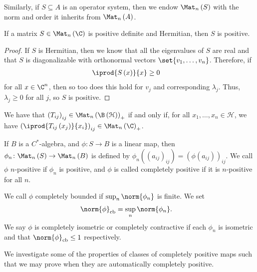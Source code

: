 \documentclass[10pt]{mypackage}
\DeclareMathOperator{\cb}{cb}
\begin{document}
Similarly, if $S\subseteq A$ is an operator system, then we endow $\Mat_n\left( S \right)$ with the norm and order it inherits from $\Mat_n\left( A \right)$.
\begin{definition}
  If a matrix $S\in \Mat_n\left( \C \right)$ is positive definite and Hermitian, then $S$ is positive.
\end{definition}
\begin{proof}
  If $S$ is Hermitian, then we know that all the eigenvalues of $S$ are real and that $S$ is diagonalizable with orthonormal vectors $\set{v_1,\dots,v_n}$. Therefore, if 
  \begin{align*}
    \iprod{S\left( x \right)}{x} &\geq 0
  \end{align*}
  for all $x\in \C^n$, then so too does this hold for $v_j$ and corresponding $\lambda_j$. Thus, $\lambda_j\geq 0$ for all $j$, so $S$ is positive.
\end{proof}
\begin{lemma}
  We have that $\left( T_{ij} \right)_{ij}\in \Mat_{n}\left( \B\left( \mathcal{H} \right) \right)_{+}$ if and only if, for all $x_1,\dots,x_n\in \mathcal{H}$, we have $\left( \iprod{T_{ij}\left( x_j \right)}{x_i} \right)_{ij}\in \Mat_n\left( \C \right)_{+}$.
\end{lemma}
\begin{definition}
  If $B$ is a $C^{\ast}$-algebra, and $\phi\colon S\rightarrow B$ is a linear map, then $\phi_n\colon \Mat_n\left( S \right)\rightarrow \Mat_n\left( B \right)$ is defined by $\phi_n\left( \left( a_{ij} \right)_{ij} \right) = \left( \phi\left( a_{ij} \right) \right)_{ij}$. We call $\phi$ $n$-positive if $\phi_n$ is positive, and $\phi$ is called completely positive if it is $n$-positive for all $n$.\newline

  We call $\phi$ completely bounded if $\sup_{n}\norm{\phi_n}$ is finite. We set
  \begin{align*}
    \norm{\phi}_{\cb} &= \sup_{n}\norm{\phi_n}.
  \end{align*}
  We say $\phi$ is completely isometric or completely contractive if each $\phi_n$ is isometric and that $\norm{\phi}_{\cb} \leq 1$ respectively.
\end{definition}
We investigate some of the properties of classes of completely positive maps such that we may prove when they are automatically completely positive.
\end{document}
